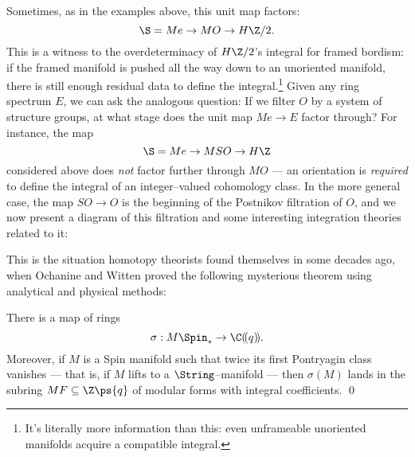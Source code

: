 Sometimes, as in the examples above, this unit map factors: \[\S = Me \to MO \to H\Z/2.\]  This is a witness to the overdeterminacy of $H\Z/2$'s integral for framed bordism: if the framed manifold is pushed all the way down to an unoriented manifold, there is still enough residual data to define the integral.\footnote{It's literally more information than this: even unframeable unoriented manifolds acquire a compatible integral.}  Given any ring spectrum $E$, we can ask the analogous question: If we filter $O$ by a system of structure groups, at what stage does the unit map $Me \to E$ factor through?  For instance, the map \[\S = Me \to MSO \to H\Z\] considered above does \emph{not} factor further through $MO$ --- an orientation is \emph{required} to define the integral of an integer--valued cohomology class.  In the more general case, the map $SO \to O$ is the beginning of the Postnikov filtration of $O$,  and we now present a diagram of this filtration and some interesting integration theories related to it:
\begin{center}
\end{center}

This is the situation homotopy theorists found themselves in some decades ago, when Ochanine and Witten proved the following mysterious theorem using analytical and physical methods:

\begin{theorem}\label{OchanineWittenTheorem}
There is a map of rings \[\sigma: M\Spin_* \to \C(\!(q)\!).\]  Moreover, if $M$ is a Spin manifold such that twice its first Pontryagin class vanishes --- that is, if $M$ lifts to a $\String$--manifold --- then $\sigma(M)$ lands in the subring $MF \subseteq \Z\ps{q}$ of modular forms with integral coefficients. \qed
\end{theorem}

